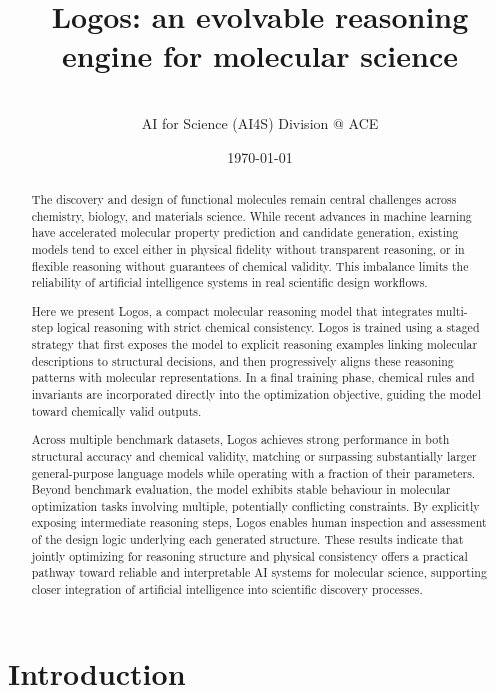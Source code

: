 \documentclass[11pt]{article}
\title{Logos: an evolvable reasoning engine for molecular science}
\author{\\ AI for Science (AI4S) Division @ ACE}
\date{\today}
\begin{document}
\maketitle

\begin{abstract}
The discovery and design of functional molecules remain central challenges across chemistry, biology, and materials science. While recent advances in machine learning have accelerated molecular property prediction and candidate generation, existing models tend to excel either in physical fidelity without transparent reasoning, or in flexible reasoning without guarantees of chemical validity. This imbalance limits the reliability of artificial intelligence systems in real scientific design workflows.

Here we present Logos, a compact molecular reasoning model that integrates multi-step logical reasoning with strict chemical consistency. Logos is trained using a staged strategy that first exposes the model to explicit reasoning examples linking molecular descriptions to structural decisions, and then progressively aligns these reasoning patterns with molecular representations. In a final training phase, chemical rules and invariants are incorporated directly into the optimization objective, guiding the model toward chemically valid outputs.

Across multiple benchmark datasets, Logos achieves strong performance in both structural accuracy and chemical validity, matching or surpassing substantially larger general-purpose language models while operating with a fraction of their parameters. Beyond benchmark evaluation, the model exhibits stable behaviour in molecular optimization tasks involving multiple, potentially conflicting constraints. By explicitly exposing intermediate reasoning steps, Logos enables human inspection and assessment of the design logic underlying each generated structure. These results indicate that jointly optimizing for reasoning structure and physical consistency offers a practical pathway toward reliable and interpretable AI systems for molecular science, supporting closer integration of artificial intelligence into scientific discovery processes.
\end{abstract}



\section{Introduction}
\end{document}
